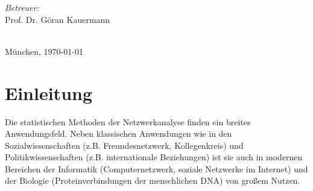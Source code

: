 \documentclass[a4paper,ngerman,oneside,titlepage,bibliography=totoc,11pt]{scrreprt}
\begin{document}
\begin{titlepage}
\begin{minipage}[t]{0.4\textwidth}
\begin{flushright}
\emph{Betreuer:}\\[2mm]
Prof. Dr. Göran Kauermann\\[6mm]
\end{flushright}
\end{minipage}\\[4.5cm]

München, \today
\end{titlepage}




\begin{abstract}


\begin{center}
{\it \bf Abstract} 
\end{center}

\noindent
Die \emph{NISAT Database} des \emph{Peace Research Institute Oslo (PRIO)} enthält Daten über den internationalen Handel mit Kleinwaffen und Leichtwaffen von insgesamt 239 verschiedenen Ländern im Zeitraum von 1992 bis 2011. Diese wurden mit neuen Methoden der statistischen Netzwerkanalyse untersucht.\\

\noindent
Im Rahmen des Projekts wurde zunächst eine deskriptive Analyse durchgeführt, die unter anderem zentrale Akteure des Netzwerkes identifizieren konnte. Ein besonderes Augenmerk galt hier der Veränderung der Netzwerkstrukturen über die Zeit. Anschließend wurde mit Hilfe zusätzlicher Kovariablen versucht, ein \emph{Exponential Random Graph Model (ERGM)} auf die Netzwerkdaten der einzelnen Jahre anzupassen. Die Ergebnisse der Modellierung wurden abschließend mit denen eines vorhergehenden Projekts über den Handel mit Großwaffen verglichen.
 


\end{abstract}




\tableofcontents




\chapter{Einleitung}
Die statistischen Methoden der Netzwerkanalyse finden ein breites Anwendungsfeld. Neben klassischen Anwendungen wie in den Sozialwissenschaften (z.B. Freundesnetzwerk, Kollegenkreis)  und Politikwissenschaften (z.B. internationale Beziehungen) ist sie auch in modernen Bereichen der Informatik (Computernetzwerk, soziale Netzwerke im Internet) und der Biologie (Proteinverbindungen der menschlichen DNA) von großem Nutzen.
\end{document}
